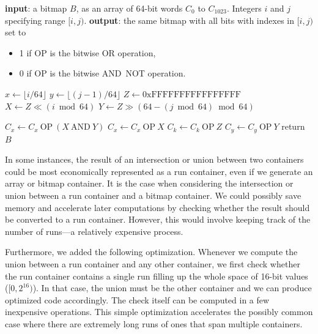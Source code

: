 \documentclass[times]{speauth}
\begin{document}
\begin{description}
\begin{algorithm}[tb]
\caption{\label{algo:set}Algorithm to set a range of bits to 0 or 1 in a bitmap.
}
\centering
\begin{algorithmic}[1]
\STATE \textbf{input}:  a bitmap $B$, as an array of 64-bit words $C_0$ to $C_{1023}$. Integers $i$ and $j$ specifying range $[i,j)$.
\STATE \textbf{output}: the same bitmap with all bits with indexes in $[i,j)$ set to
\begin{itemize}\item 1 if OP is the bitwise OR operation,
\item 0  if OP is the bitwise AND~NOT operation.\end{itemize}
\STATE $ x \leftarrow \lfloor i / 64 \rfloor$
\STATE $y \leftarrow  \lfloor (j-1) / 64 \rfloor$
\STATE $Z \leftarrow \mathrm{0xFFFFFFFFFFFFFFFF}$    \hfill {}
\STATE $X \leftarrow Z \ll (i\bmod 64)$ \hfill {}
\STATE $Y \leftarrow Z \gg (64-(j\bmod 64) \bmod 64)$ \hfill {}

\STATE $C_x \leftarrow C_x \mathrm{~OP~} (X \mathrm{~AND~} Y)$
\ELSE
\STATE $C_x \leftarrow C_x \mathrm{~OP~} X $
\STATE $C_k \leftarrow C_k \mathrm{~OP~} Z $
\ENDFOR
\STATE $C_y \leftarrow C_y \mathrm{~OP~} Y $
\ENDIF
\STATE return $B$
\end{algorithmic}
\end{algorithm}



In some instances, the result of an intersection
or union between two containers could be most economically
represented as a run container, even if we generate an array or
bitmap container. It is the case when considering
the intersection or union between a run container and a bitmap container.
We could possibly save memory and accelerate later computations by
checking whether the result should be converted to a run container.
However, this would involve keeping track of the number of runs---a
relatively expensive process.


\end{description}




Furthermore, we added the following optimization. Whenever we compute the union between a run container and any other container, we first check whether the run container contains a single run filling up the whole space of 16-bit values ($[0,2^{16})$). In that case, the union must be the other container and we can produce optimized code accordingly. The check itself can be computed in a few inexpensive operations.
This simple optimization accelerates the possibly common case where there are extremely long runs of ones that span multiple containers.
\end{document}
